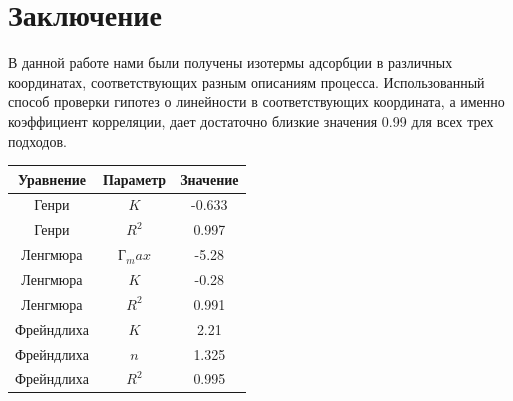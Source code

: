 \documentclass[a4paper]{article}
\begin{document}
\section{\LARGE \textbf{Заключение}}
\par \vspace{0.3 cm}
В данной работе нами были получены изотермы адсорбции в различных координатах, соответствующих разным описаниям процесса. Использованный способ проверки гипотез о линейности в соответствующих координата, а именно коэффициент корреляции, дает достаточно близкие значения 0.99 для всех трех подходов.  \par \vspace{0.3 cm} 

\begin{table}[h!]
	\centering
	\begin{tabular}{|c|c|c|}
	\hline
	Уравнение& Параметр & Значение \\
	\hline
	Генри & $K$ &  -0.633\\
	Генри & $R^2$ & 0.997 \\
	\hline
	Ленгмюра & $\text{Г}_max$ & -5.28 \\
	Ленгмюра & $K$ &  -0.28\\
	Ленгмюра & $R^2$ &  0.991\\
	\hline
	Фрейндлиха & $K$ &  2.21\\
	Фрейндлиха & $n$ &  1.325\\
	Фрейндлиха & $R^2$ &  0.995\\
	\hline

	\end{tabular}
\end{table}
\end{document}
